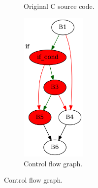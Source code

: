 \begin{figure}[htbp]
	\centering
	\begin{subfigure}[b]{0.30\textwidth}
		\centering
		
		\caption{Original C source code.}
	\end{subfigure}
	\begin{subfigure}[b]{0.50\textwidth}
		\centering
		\includegraphics[width=0.35\textwidth]{inc/appendices/examples/interval/counter-example/bool_propagation_jump/f_0001a.png}
		\caption{Control flow graph.}
	\end{subfigure}
\end{figure}

